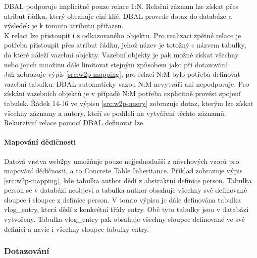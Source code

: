 \documentclass[ing,male,java,dept456]{diploma}						%
\begin{document}
DBAL podporuje implicitně pouze relace 1:N. Relační záznam lze získat přes atribut řádku, který obsahuje cizí klíč. DBAL provede dotaz do databáze a výsledek je k tomuto atributu přiřazen. \\
K relaci lze přistoupit i z odkazovaného objektu. Pro realizaci zpětné relace je potřeba přistoupit přes atribut řádku, jehož název je totožný s názvem tabulky, do které náleží vazební objekty. Vazební objekty je pak možné získat všechny nebo jejich množinu dále limitovat stejným způsobem jako při dotazování. \\
Jak zobrazuje výpis \ref{src:w2p-mapping}, pro relaci N:M bylo potřeba definovat vazební tabulku. DBAL automaticky vazbu N:M nevytváří ani nepodporuje. Pro získání vazebních objektů je v případě N:M potřeba explicitně provést spojení tabulek. Řádek 14-16 ve výpisu \ref{src:w2p-query} zobrazuje dotaz, kterým lze získat všechny záznamy a autory, kteří se podíleli na vytváření těchto záznamů. \\
Rekurzivní relace pomocí DBAL definovat lze. \\

\paragraph{Mapování dědičnosti}
Datová vrstva web2py umožňuje pouze nejjednodušší z návrhových vzorů pro mapování dědičnosti, a to Concrete Table Inheritance. Příklad zobrazuje výpis \ref{src:w2p-mapping}, kde tabulka author dědí z abstraktní definice person. Tabulka person se v databázi neobjeví a tabulka author obsahuje všechny své definované sloupce i sloupce z definice person. V tomto výpisu je dále definována tabulka vlog\_entry, která dědí z konkrétní třídy entry. Obě tyto tabulky jsou v databázi vytvořeny. Tabulka vlog\_entry pak obsahuje všechny sloupce definované ve své definici a navíc i všechny sloupce tabulky entry.

\subsubsection{Dotazování}
\end{document}
